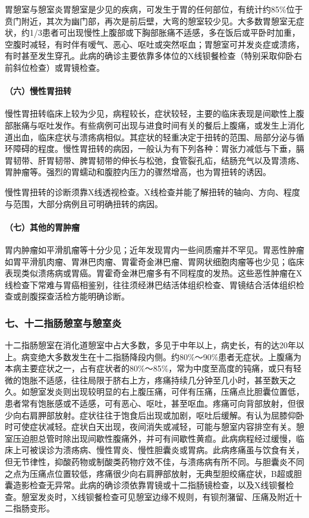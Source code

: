 胃憩室与憩室炎胃憩室是少见的疾病，可发生于胃的任何部位，有统计约85\%位于贲门附近，其次为幽门部，再次是前后壁，大弯的憩室较少见。大多数胃憩室无症状，约1/3患者可出现慢性上腹部或下胸部胀痛不适感，多在饭后或平卧时加重，空腹时减轻，有时伴有嗳气、恶心、呕吐或突然呕血；胃憩室可并发炎症或溃疡，有时甚至发生穿孔。此病的确诊主要依靠多体位的X线钡餐检查（特别采取仰卧右前斜位检查）或胃镜检查。

\paragraph{（六）慢性胃扭转}

慢性胃扭转临床上较为少见，病程较长，症状较轻，主要的临床表现是间歇性上腹部胀痛与呕吐发作。有些病例可出现与进食时间有关的餐后上腹痛，或发生上消化道出血，临床症状与溃疡病相似。其症状的轻重决定于扭转的范围、局部分泌与循环障碍的程度。慢性胃扭转的病因，一般认为有下列各种：胃张力减低与下垂，膈胃韧带、肝胃韧带、脾胃韧带的伸长与松弛，食管裂孔疝，结肠充气以及胃溃疡、胃肿瘤等。强烈的胃蠕动和腹腔内压力的骤然增高，也为胃扭转的诱因。

慢性胃扭转的诊断须靠X线透视检查。X线检查并能了解扭转的轴向、方向、程度与范围，大部分病例且可明确扭转的病因。

\paragraph{（七）其他的胃肿瘤}

胃内肿瘤如平滑肌瘤等十分少见；近年发现胃内一些间质瘤并不罕见。胃恶性肿瘤如胃平滑肌肉瘤、胃淋巴肉瘤、胃霍奇金淋巴瘤、胃网状细胞肉瘤等也少见；临床表现类似溃疡病或胃癌。胃霍奇金淋巴瘤多有不同程度的发热。这些恶性肿瘤在X线检查下常难与胃癌相鉴别，往往须经淋巴结活体组织检查、胃镜结合活体组织检查或剖腹探查活检方能明确诊断。

\subsubsection{七、十二指肠憩室与憩室炎}

十二指肠憩室在消化道憩室中占大多数，多见于中年以上，病史长，有的达20年以上。病变绝大多数发生在十二指肠降段内侧。约80\%～90\%患者无症状。上腹痛为本病主要症状之一，占有症状者的80\%～85\%，常为中度至高度的钝痛，或只有轻微的饱胀不适感，往往局限于脐右上方，疼痛持续几分钟至几小时，甚至数天之久。如憩室发炎则出现较明显的右上腹压痛，可伴有压痛，压痛点比胆囊位置低，患者常有饱胀感或不适感，可有恶心、呕吐，甚至呕血。疼痛可向背部放射，但很少向右肩胛部放射。症状往往于饱食后出现或加剧，呕吐后缓解。有认为屈膝仰卧时可使症状减轻。症状白天出现，夜间消失或减轻，可能与憩室内容排空有关。憩室压迫胆总管时除出现间歇性腹痛外，并可有间歇性黄疸。此病病程经过缓慢，临床上可被误诊为溃疡病、慢性胃炎、慢性胆囊炎或胃病。此病疼痛虽与饮食有关，但无节律性，抑酸药物或制酸类药物疗效不佳，与溃疡病有所不同。与胆囊炎不同之点为压痛点位置较低，疼痛很少向右肩胛部放射，无典型胆绞痛症状，B超或胆囊造影检查无异常。此病的确诊须依靠胃镜或十二指肠镜检查，以及X线钡餐检查。憩室发炎时，X线钡餐检查可见憩室边缘不规则，有钡剂潴留、压痛及附近十二指肠变形。

